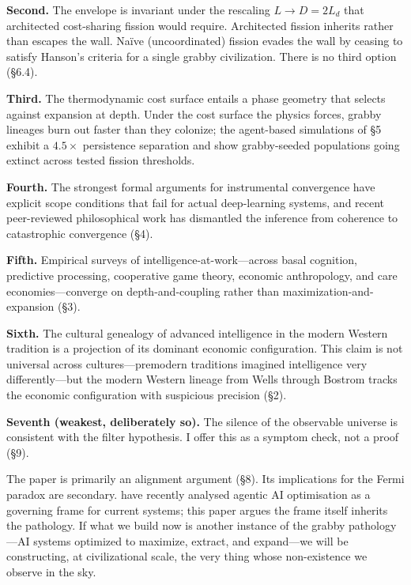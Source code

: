 \documentclass[11pt,twocolumn]{article}
\begin{document}
\textbf{Second.} The envelope is invariant under the rescaling $L \to D
= 2L_{d}$ that architected cost-sharing fission would require. Architected
fission inherits rather than escapes the wall. Naïve (uncoordinated)
fission evades the wall by ceasing to satisfy Hanson's criteria for a
single grabby civilization. There is no third option (\S 6.4).

\textbf{Third.} The thermodynamic cost surface entails a phase geometry
that selects against expansion at depth. Under the cost surface the physics
forces, grabby lineages burn out faster than they colonize; the agent-based
simulations of \S 5 exhibit a $4.5\times$ persistence separation and show
grabby-seeded populations going extinct across tested fission thresholds.

\textbf{Fourth.} The strongest formal arguments for instrumental
convergence have explicit scope conditions that fail for actual
deep-learning systems, and recent peer-reviewed philosophical work has
dismantled the inference from coherence to catastrophic convergence (\S 4).

\textbf{Fifth.} Empirical surveys of intelligence-at-work—across basal
cognition, predictive processing, cooperative game theory, economic
anthropology, and care economies—converge on depth-and-coupling rather than
maximization-and-expansion (\S 3).

\textbf{Sixth.} The cultural genealogy of advanced intelligence in the
modern Western tradition is a projection of its dominant economic
configuration. This claim is not universal across cultures—premodern
traditions imagined intelligence very differently—but the modern Western
lineage from Wells through Bostrom tracks the economic configuration with
suspicious precision (\S 2).

\textbf{Seventh (weakest, deliberately so).} The silence of the observable
universe is consistent with the filter hypothesis. I offer this as a
symptom check, not a proof (\S 9).

The paper is primarily an alignment argument (\S 8). Its implications for
the Fermi paradox are secondary. \citet{FloridiAAIO} have recently analysed
agentic AI optimisation as a governing frame for current systems; this paper
argues the frame itself inherits the pathology. If what we build now is
another instance of the grabby pathology—AI systems optimized to maximize,
extract, and expand—we will be constructing, at civilizational scale, the
very thing whose non-existence we observe in the sky.

\end{document}
